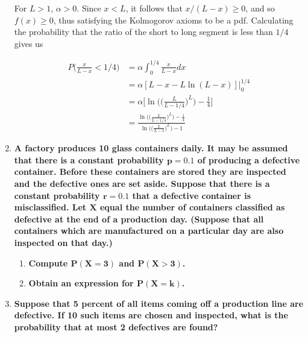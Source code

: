 \documentclass[10pt, oneside]{article}   	%
\theoremstyle{definition}
\begin{document}
\begin{enumerate}[label=4.\arabic*]
For $L > 1$, $\alpha > 0$. Since $x < L$, it follows that $x / (L-x) \geq 0$, and so $f(x) \geq 0$, thus satisfying the Kolmogorov axioms to be a pdf. Calculating the probability that the ratio of the short to long segment is less than $1/4$ gives us

\begin{align*}
P\Big( \frac{x}{L-x} < 1/4 \Big) &= \alpha \int^{1/4}_0 \frac{x}{L-x} dx \\
&= \alpha [L-x-L \ln (L-x)] \Big|^{1/4}_0 \\
&= \alpha \Big[ \ln \Big( \Big( \frac{L}{L - 1/4} \Big)^L \Big) - \frac{1}{4} \Big] \\
&= \boxed{ \frac{ \ln \Big( \Big( \frac{L}{L - 1/4} \Big)^L \Big) - \frac{1}{4} }{ \ln \Big( \Big( \frac{L}{L-1} \Big)^L \Big) - 1 } }
\end{align*}

\item  \begin{tcolorbox}[
  colback=Cerulean!5!white,
  colframe=Cerulean!75!black]
\textbf{A factory produces 10 glass containers daily. It may be assumed that there is a constant probability $\bm{p = 0.1}$ of producing a defective container. Before these containers are stored they are inspected and the defective ones are set aside. Suppose that there is a constant probability $\bm{r = 0.1}$ that a defective container is misclassified. Let $\bm{X}$ equal the number of containers classified as defective at the end of a production day. (Suppose that all containers which are manufactured on a particular day are also inspected on that day.)}
\end{tcolorbox}

	\begin{enumerate}
	\item  \begin{tcolorbox}[
	  colback=Cerulean!5!white,
	  colframe=Cerulean!75!black]
	\textbf{Compute $\bm{P(X = 3)}$ and $\bm{P(X > 3)}$.}
	\end{tcolorbox}
	
	\item  \begin{tcolorbox}[
	  colback=Cerulean!5!white,
	  colframe=Cerulean!75!black]
	\textbf{Obtain an expression for $\bm{P(X = k)}$.}
	\end{tcolorbox}
	\end{enumerate}

\item  \begin{tcolorbox}[
  colback=Cerulean!5!white,
  colframe=Cerulean!75!black]
\textbf{Suppose that 5 percent of all items coming off a production line are defective. If 10 such items are chosen and inspected, what is the probability that at most 2 defectives are found?}
\end{tcolorbox}


\end{enumerate}
\end{document}
